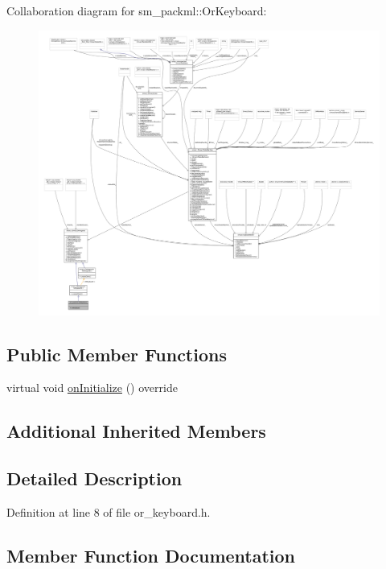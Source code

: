 Collaboration diagram for sm\+\_\+packml\+:\+:Or\+Keyboard\+:
\nopagebreak
\begin{figure}[H]
\begin{center}
\leavevmode
\includegraphics[width=350pt]{classsm__packml_1_1OrKeyboard__coll__graph}
\end{center}
\end{figure}
\subsection*{Public Member Functions}
\begin{DoxyCompactItemize}
\item 
virtual void \hyperlink{classsm__packml_1_1OrKeyboard_ab0a1a2d5686330dc75a1c203009ded0a}{on\+Initialize} () override
\end{DoxyCompactItemize}
\subsection*{Additional Inherited Members}


\subsection{Detailed Description}


Definition at line 8 of file or\+\_\+keyboard.\+h.



\subsection{Member Function Documentation}
